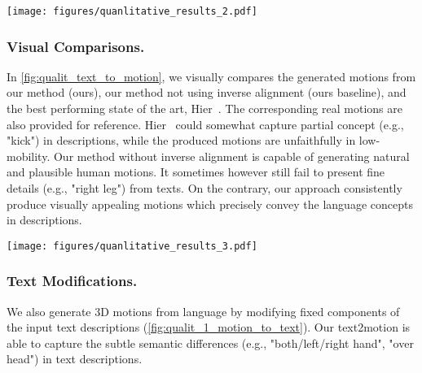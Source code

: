 \documentclass[runningheads]{llncs}
\newcommand{\beforefigcaption}{\vspace{-9mm}}
\newcommand{\afterfigcaption}{\vspace{-5mm}}
\newcommand{\beforesubsubsection}{\vspace{-5mm}}
\begin{document}
\begin{figure*}[t]
	\centering
	\texttt{[image: figures/quanlitative\_results\_2.pdf]}
		 \beforefigcaption
	\caption{Visual comparisons of generated motions from the same language descriptions. For each description, we show its corresponding real motion, one motion from Hier~\cite{ghosh2021synthesis} (since it's deterministic) and ours method without inverse alignment, as well as two motions from our method. Key frames of variable-length motion clips are shown. Refer to supplementary files for complete motions and more results.} 
	\label{fig:qualit_text_to_motion}
	 \afterfigcaption
\end{figure*}

\beforesubsubsection
\subsubsection{Visual Comparisons.} In \cref{fig:qualit_text_to_motion}, we visually compares the generated motions from our method (ours), our method not using inverse alignment (ours baseline), and the best performing state of the art,  Hier~\cite{ghosh2021synthesis}. The corresponding real motions are also provided for reference. Hier~\cite{ghosh2021synthesis} could somewhat capture partial concept (e.g., "kick") in descriptions, while the produced motions are unfaithfully in low-mobility. Our method without inverse alignment is capable of generating natural and plausible human motions. It sometimes however still fail to present fine details (e.g., "right leg") from texts. On the contrary, our approach consistently produce visually appealing motions which precisely convey the language concepts in descriptions.

\begin{figure*}[t]
	\centering
	\texttt{[image: figures/quanlitative\_results\_3.pdf]}
		 \beforefigcaption
	\caption{Examples of text-to-motion mapping by modifying specific parts of text descriptions (highlighted in \textcolor{red}{red} box). For each description, we show two resultant motions.}
	\label{fig:qualit_1_motion_to_text}
	 \afterfigcaption
\end{figure*}


\beforesubsubsection
\subsubsection{Text Modifications.} We also generate 3D motions from language by modifying fixed components of the input text descriptions (\cref{fig:qualit_1_motion_to_text}). Our text2motion is able to capture the subtle semantic differences (e.g., "both/left/right hand", "over head") in text descriptions.
\end{document}
